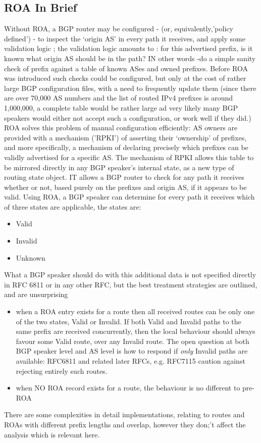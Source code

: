 \subsection{ROA In Brief}
Without ROA, a BGP router may be configured - (or, equivalently,'policy defined') - to inspect the `origin AS' in every path it receives, and apply some validation logic ; the validation logic amounts to : for this advertised prefix, is it known what origin AS should be in the path?  IN other words -do a simple sanity check of prefix against a table of known ASes and owned prefixes.  Before ROA was introduced such checks could be configured, but only at the cost of rather large BGP configuration files, with a need to frequently update them (since there are over 70,000 AS numbers and the list of routed IPv4 prefixes is around 1,000,000, a complete table would be rather large ad very likely many BGP speakers would either not accept such a configuration, or work well if they did.)
ROA solves this problem of manual configuration efficiently: AS owners are provided with a mechanism ('RPKI') of asserting their `ownership' of prefixes, and more specifically, a mechanism of declaring precisely which prefixes can be validly advertised for a specific AS.  The mechanism of RPKI allows this table to be mirrored directly in any BGP speaker's internal state, as a new type of routing state object.  IT allows a BGP router to check for any path it receives whether or not, based purely on the prefixes and origin AS, if it appears to be valid.  Using ROA, a BGP speaker can determine for every path it receives which of three states are applicable, the states are:
\begin{itemize}
	\item Valid
	\item Invalid
	\item Unknown
\end{itemize}
What a BGP speaker should do with this additional data is not specified directly in RFC 6811 or in any other RFC, but the best treatment strategies are outlined, and are unsurprising
\begin{itemize}
	\item when a ROA entry exists for a route then all received routes can be only one of the two states, Valid or Invalid.  If both Valid and Invalid paths to the same prefix are received concurrently, then the local behaviour should always favour some Valid route, over any Invalid route.  The open question at both BGP speaker level and AS level is how to respond if \emph{only} Invalid paths are available: RFC6811 and related later RFCs, e.g. RFC7115 \cite{rfc7115} caution against rejecting entirely such routes.
	\item when NO ROA record exists for a route, the behaviour is no different to pre-ROA
\end{itemize}
There are some complexities in detail implementations, relating to routes and ROAs with different prefix lengths and overlap, however they don;'t affect the analysis which is relevant here.

